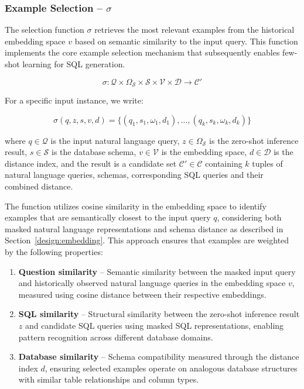 \subsubsection{Example Selection – $\sigma$}\label{design:selection-function}

The selection function $\sigma$ retrieves the most relevant examples from the
historical embedding space $v$ based on semantic similarity to the
input query. This function implements the core example selection mechanism 
that subsequently enables few-shot learning for SQL generation.

$$
\sigma: \mathcal{Q} \times \Omega_{\mathcal{S}} \times \mathcal{S} \times \mathcal{V} \times \mathcal{D} \rightarrow \mathcal{C}'
$$

\vspace{0.5em}

For a specific input instance, we write:

$$
\sigma(q, z, s, v, d) = \{(q_1, s_1, \omega_1, d_1), \ldots, (q_k, s_k, \omega_k, d_k)\}
$$

\vspace{0.5em}

where $q \in \mathcal{Q}$ is the input natural language query, $z \in \Omega_{\mathcal{S}}$
is the zero-shot inference result, $s \in \mathcal{S}$ is the database schema,
$v \in \mathcal{V}$ is the embedding space, $d \in \mathcal{D}$ is the distance index,
and the result is a candidate set $\mathcal{C}' \in \mathcal{C}$ containing $k$
tuples of natural language queries, schemas, corresponding SQL queries and their
combined distance.

The function utilizes cosine similarity in the embedding space to identify examples
that are semantically closest to the input query $q$, considering both masked natural
language representations and schema distance as described in Section~\ref{design:embedding}.
This approach ensures that examples are weighted by the following properties:

\begin{enumerate}
    \item \textbf{Question similarity} – Semantic similarity between the masked input
        query and historically observed natural language queries in the embedding space
        $v$, measured using cosine distance between their respective embeddings.
    \item \textbf{SQL similarity} – Structural similarity between the zero-shot inference
        result $z$ and candidate SQL queries using masked SQL representations, enabling
        pattern recognition across different database domains.
    \item \textbf{Database similarity} – Schema compatibility measured through the distance
        index $d$, ensuring selected examples operate on analogous database
        structures with similar table relationships and column types.
\end{enumerate}

